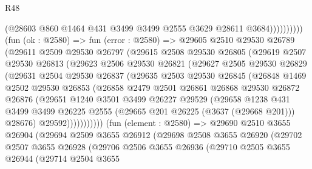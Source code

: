 \begin{lexlean}{R48}
\begin{coremodule}
                          (@28603 @860 @1464 @431 @3499 @3499 @2555 @3629 @28611 @3684))))))))))
        (fun (ok : @2580) =>
        fun (error : @2580) =>
        @29605
          @2510
          @29530
          @26789
          (@29611
            @2509
            @29530
            @26797
            (@29615
              @2508
              @29530
              @26805
              (@29619
                @2507
                @29530
                @26813
                (@29623
                  @2506
                  @29530
                  @26821
                  (@29627
                    @2505
                    @29530
                    @26829
                    (@29631
                      @2504
                      @29530
                      @26837
                      (@29635
                        @2503
                        @29530
                        @26845
                        (@26848
                          @1469
                          @2502
                          @29530
                          @26853
                          (@26858
                            @2479
                            @2501
                            @26861
                            @26868
                            @29530
                            @26872
                            @26876
                            (@29651
                              @1240
                              @3501
                              @3499
                              @26227
                              @29529
                              (@29658
                                @1238
                                @431
                                @3499
                                @3499
                                @26225
                                @2555
                                (@29665 @201 @26225 (@3637 (@29668 @201)))
                                @28676)
                              @29592)))))))))))
        (fun (element : @2580) =>
        @29690
          @2510
          @3655
          @26904
          (@29694
            @2509
            @3655
            @26912
            (@29698
              @2508
              @3655
              @26920
              (@29702
                @2507
                @3655
                @26928
                (@29706
                  @2506
                  @3655
                  @26936
                  (@29710
                    @2505
                    @3655
                    @26944
                    (@29714
                      @2504
                      @3655

\end{coremodule}
\end{lexlean}
